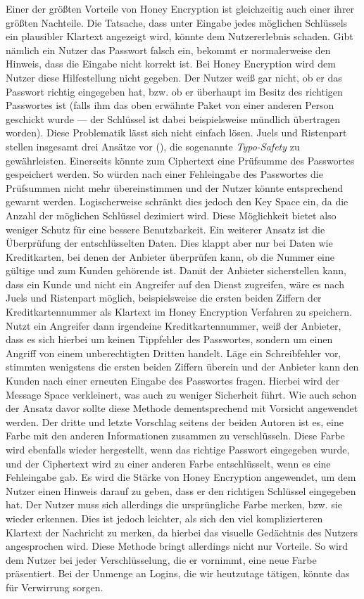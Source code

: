 \documentclass[12pt]{scrartcl}
\begin{document}
Einer der größten Vorteile von Honey Encryption ist gleichzeitig auch einer ihrer größten Nachteile. Die Tatsache, dass unter Eingabe jedes möglichen Schlüssels ein plausibler Klartext angezeigt wird, könnte dem Nutzererlebnis schaden. Gibt nämlich ein Nutzer das Passwort falsch ein, bekommt er normalerweise den Hinweis, dass die Eingabe nicht korrekt ist. Bei Honey Encryption wird dem Nutzer diese Hilfestellung nicht gegeben. Der Nutzer weiß gar nicht, ob er das Passwort richtig eingegeben hat, bzw. ob er überhaupt im Besitz des richtigen Passwortes ist (falls ihm das oben erwähnte Paket von einer anderen Person geschickt wurde --- der Schlüssel ist dabei beispielsweise mündlich übertragen worden). Diese Problematik lässt sich nicht einfach lösen. Juels und Ristenpart stellen insgesamt drei Ansätze vor (\cite{CRCS2014, EURO2014}), die sogenannte \emph{Typo-Safety} zu gewährleisten. Einerseits könnte zum Ciphertext eine Prüfsumme des Passwortes gespeichert werden. So würden nach einer Fehleingabe des Passwortes die Prüfsummen nicht mehr übereinstimmen und der Nutzer könnte entsprechend gewarnt werden. Logischerweise schränkt dies jedoch den Key Space ein, da die Anzahl der möglichen Schlüssel dezimiert wird. Diese Möglichkeit bietet also weniger Schutz für eine bessere Benutzbarkeit. Ein weiterer Ansatz ist die Überprüfung der entschlüsselten Daten. Dies klappt aber nur bei Daten wie Kreditkarten, bei denen der Anbieter überprüfen kann, ob die Nummer eine gültige und zum Kunden gehörende ist. Damit der Anbieter sicherstellen kann, dass ein Kunde und nicht ein Angreifer auf den Dienst zugreifen, wäre es nach Juels und Ristenpart möglich, beispielsweise die ersten beiden Ziffern der Kreditkartennummer als Klartext im Honey Encryption Verfahren zu speichern. Nutzt ein Angreifer dann irgendeine Kreditkartennummer, weiß der Anbieter, dass es sich hierbei um keinen Tippfehler des Passwortes, sondern um einen Angriff von einem unberechtigten Dritten handelt. Läge ein Schreibfehler vor, stimmten wenigstens die ersten beiden Ziffern überein und der Anbieter kann den Kunden nach einer erneuten Eingabe des Passwortes fragen. Hierbei wird der Message Space verkleinert, was auch zu weniger Sicherheit führt. Wie auch schon der Ansatz davor sollte diese Methode dementsprechend mit Vorsicht angewendet werden. Der dritte und letzte Vorschlag seitens der beiden Autoren ist es, eine Farbe mit den anderen Informationen zusammen zu verschlüsseln. Diese Farbe wird ebenfalls wieder hergestellt, wenn das richtige Passwort eingegeben wurde, und der Ciphertext wird zu einer anderen Farbe entschlüsselt, wenn es eine Fehleingabe gab. Es wird die Stärke von Honey Encryption angewendet, um dem Nutzer einen Hinweis darauf zu geben, dass er den richtigen Schlüssel eingegeben hat. Der Nutzer muss sich allerdings die ursprüngliche Farbe merken, bzw. sie wieder erkennen. Dies ist jedoch leichter, als sich den viel komplizierteren Klartext der Nachricht zu merken, da hierbei das visuelle Gedächtnis des Nutzers angesprochen wird. Diese Methode bringt allerdings nicht nur Vorteile. So wird dem Nutzer bei jeder Verschlüsselung, die er vornimmt, eine neue Farbe präsentiert. Bei der Unmenge an Logins, die wir heutzutage tätigen, könnte das für Verwirrung sorgen.
\end{document}
